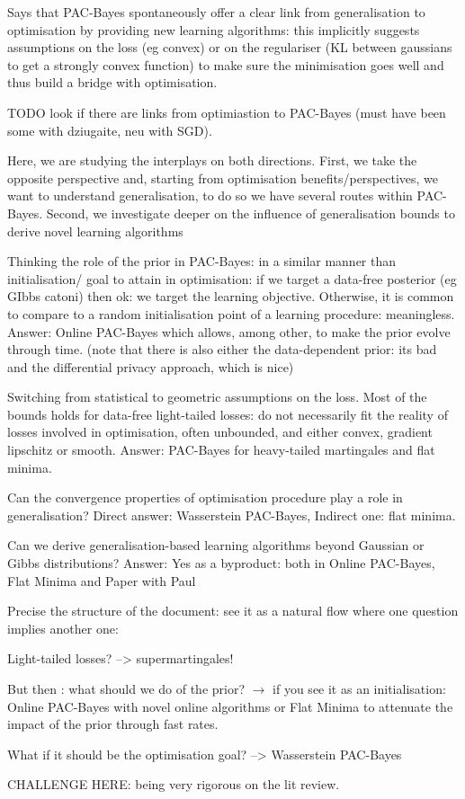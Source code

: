 Says that PAC-Bayes spontaneously offer a clear link from generalisation to optimisation by providing new learning algorithms: this implicitly suggests assumptions on the loss (eg convex) or on the regulariser (KL between gaussians to get a strongly convex function) to make sure the minimisation goes well and thus build a bridge with optimisation.

TODO look if there are links from optimiastion to PAC-Bayes (must have been some with dziugaite, neu with SGD).

Here, we are studying the interplays on both directions. First, we take the opposite perspective and, starting from optimisation benefits/perspectives, we want to understand generalisation, to do so we have several routes within PAC-Bayes. Second, we investigate deeper on the influence of generalisation bounds to derive novel learning algorithms

Thinking the role of the prior in PAC-Bayes: in a similar manner than initialisation/ goal to attain in optimisation: if we target a data-free posterior (eg GIbbs catoni) then ok: we target the learning objective. Otherwise, it is common to compare to a random initialisation point of a learning procedure: meaningless. Answer: Online PAC-Bayes which allows, among other, to make the prior evolve through time. (note that there is also either the data-dependent prior: its bad and the differential privacy approach, which is nice)

Switching from statistical to geometric assumptions on the loss. Most of the bounds holds for data-free light-tailed losses: do not necessarily fit the reality of losses involved in optimisation, often unbounded, and either convex, gradient lipschitz or smooth. Answer: PAC-Bayes for heavy-tailed martingales and flat minima.

Can the convergence properties of optimisation procedure play a role in generalisation? Direct answer: Wasserstein PAC-Bayes, Indirect one: flat minima. 

Can we derive generalisation-based learning algorithms beyond Gaussian or Gibbs distributions? Answer: Yes as a byproduct: both in Online PAC-Bayes, Flat Minima and Paper with Paul  

Precise the structure of the document: see it as a natural flow where one question implies another one: 

Light-tailed losses? --> supermartingales! 

But then : what should we do of the prior? $\rightarrow$  if you see it as an initialisation: Online PAC-Bayes with novel online algorithms or Flat Minima to attenuate the impact of the prior through fast rates.

What if it should be the optimisation goal? --> Wasserstein PAC-Bayes



 


CHALLENGE HERE: being very rigorous on the lit review.
